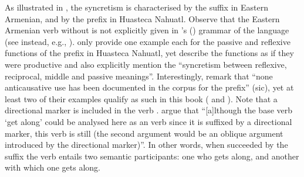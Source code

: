 As illustrated in , the syncretism is characterised by the suffix  in Eastern Armenian, and by the prefix  in Huasteca Nahuatl. Observe that the Eastern Armenian verb  without  is not explicitly given in \citeauthor{dum-tragut:2009}’s (\citeyear{dum-tragut:2009}) grammar of the language (see instead, e.g., \citealt[162]{sakayan:2007}). \cite[81f.]{llanes:al:2017} only provide one example each for the passive and reflexive functions of the prefix  in Huasteca Nahuatl, yet describe the functions as if they were productive and also explicitly mention the “syncretism between reflexive, reciprocal, middle and passive meanings”. Interestingly, \cite[102]{llanes:al:2017} remark that “none anticausative use has been documented in the corpus for the prefix” (sic), yet at least two of their examples qualify as such in this book ( and ). Note that a directional marker  is included in the verb . \cite[91]{llanes:al:2017} argue that “[a]lthough the base verb  ‘get along’ could be analysed here as an  verb since it is suffixed by a directional marker, this verb is still  (the second argument would be an oblique argument introduced by the directional marker)”. In other words, when succeeded by the suffix  the verb  entails two semantic participants: one who gets along, and another with which one gets along.

